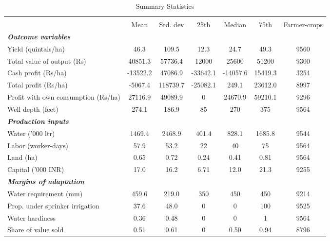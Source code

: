 \begin{table}[htbp]\centering
\def\sym#1{\ifmmode^{#1}\else\(^{#1}\)\fi}
\caption{Summary Statistics\label{tab:sumstats}}
\begin{tabular}{l*{1}{cccccc}}
\toprule
                    &\multicolumn{6}{c}{}                                                         \\
                    &        Mean&    Std. dev&        25th&      Median&        75th&Farmer-crops\\
\midrule
\textbf{\emph{Outcome variables}}&            &            &            &            &            &            \\
Yield (quintals/ha) &        46.3&       109.5&        12.3&        24.7&        49.3&        9560\\
Total value of output (Rs)&     40851.3&     57736.4&       12000&       25600&       51200&        9300\\
Cash profit (Rs/ha) &    -13522.2&     47086.9&    -33642.1&    -14057.6&     15419.3&        3254\\
Total profit (Rs/ha)&     -5067.4&    118739.7&    -25082.1&       249.1&     23612.0&        8997\\
Profit with own consumption (Rs/ha)&     27116.9&     49089.9&           0&     24670.9&     59210.1&        9296\\
Well depth (feet)   &       274.1&       186.9&          85&         270&         375&        9564\\
\textbf{\emph{Production inputs}}&            &            &            &            &            &            \\
Water ('000 ltr)    &      1469.4&      2468.9&       401.4&       828.1&      1685.8&        9544\\
Labor (worker-days) &        57.9&        53.2&          22&          40&          75&        9564\\
Land (ha)           &        0.65&        0.72&        0.24&        0.41&        0.81&        9564\\
Capital ('000 INR)  &        17.0&        16.2&        6.71&        12.0&        21.3&        9255\\
\textbf{\emph{Margins of adaptation}}&            &            &            &            &            &            \\
Water requirement (mm)&       459.6&       219.0&         350&         450&         450&        9214\\
Prop. under sprinker irrigation&        37.6&        48.0&           0&           0&         100&        9525\\
Water hardiness     &        0.36&        0.48&           0&           0&           1&        9564\\
Share of value sold &        0.51&        0.61&           0&        0.50&        0.94&        8796\\
\bottomrule
\end{tabular}
\end{table}
